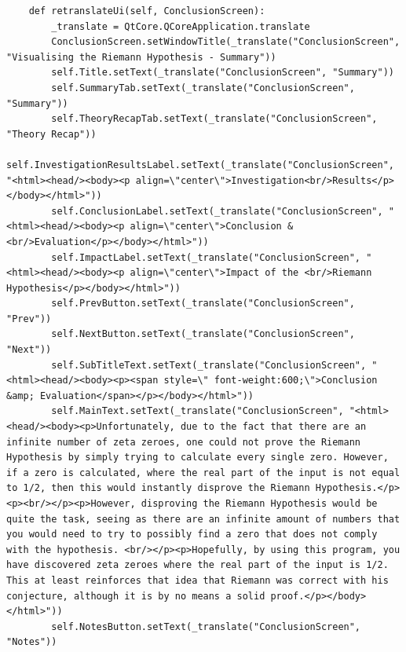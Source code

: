 \documentclass{article}
\begin{document}
\begin{lstlisting}
    def retranslateUi(self, ConclusionScreen):
        _translate = QtCore.QCoreApplication.translate
        ConclusionScreen.setWindowTitle(_translate("ConclusionScreen", "Visualising the Riemann Hypothesis - Summary"))
        self.Title.setText(_translate("ConclusionScreen", "Summary"))
        self.SummaryTab.setText(_translate("ConclusionScreen", "Summary"))
        self.TheoryRecapTab.setText(_translate("ConclusionScreen", "Theory Recap"))
        self.InvestigationResultsLabel.setText(_translate("ConclusionScreen", "<html><head/><body><p align=\"center\">Investigation<br/>Results</p></body></html>"))
        self.ConclusionLabel.setText(_translate("ConclusionScreen", "<html><head/><body><p align=\"center\">Conclusion & <br/>Evaluation</p></body></html>"))
        self.ImpactLabel.setText(_translate("ConclusionScreen", "<html><head/><body><p align=\"center\">Impact of the <br/>Riemann Hypothesis</p></body></html>"))
        self.PrevButton.setText(_translate("ConclusionScreen", "Prev"))
        self.NextButton.setText(_translate("ConclusionScreen", "Next"))
        self.SubTitleText.setText(_translate("ConclusionScreen", "<html><head/><body><p><span style=\" font-weight:600;\">Conclusion &amp; Evaluation</span></p></body></html>"))
        self.MainText.setText(_translate("ConclusionScreen", "<html><head/><body><p>Unfortunately, due to the fact that there are an infinite number of zeta zeroes, one could not prove the Riemann Hypothesis by simply trying to calculate every single zero. However, if a zero is calculated, where the real part of the input is not equal to 1/2, then this would instantly disprove the Riemann Hypothesis.</p><p><br/></p><p>However, disproving the Riemann Hypothesis would be quite the task, seeing as there are an infinite amount of numbers that you would need to try to possibly find a zero that does not comply with the hypothesis. <br/></p><p>Hopefully, by using this program, you have discovered zeta zeroes where the real part of the input is 1/2. This at least reinforces that idea that Riemann was correct with his conjecture, although it is by no means a solid proof.</p></body></html>"))
        self.NotesButton.setText(_translate("ConclusionScreen", "Notes"))
\end{lstlisting}
\end{document}
